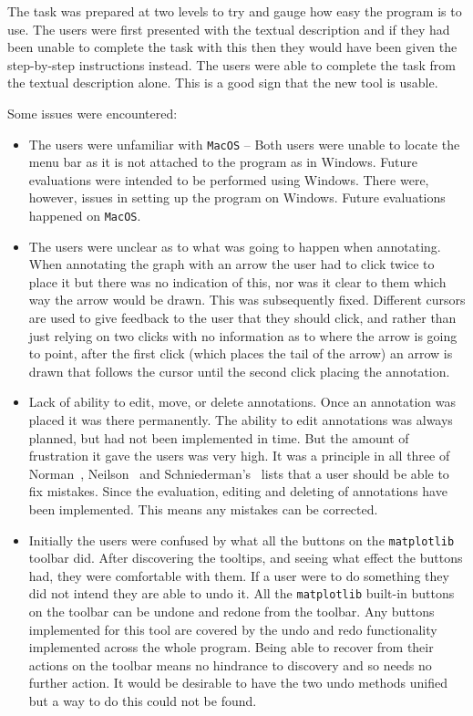 The task was prepared at two levels to try and gauge how easy the program is to use.  The users were first presented with the textual description and if they had been unable to complete the task with this then they would have been given the step-by-step instructions instead.  The users were able to complete the task from the textual description alone.  This is a good sign that the new tool is usable.

Some issues were encountered:

\begin{itemize}
\item The users were unfamiliar with \texttt{MacOS} -- Both users were unable to locate the menu bar as it is not attached to the program as in Windows.  Future evaluations were intended to be performed using Windows.  There were, however, issues in setting up the program on Windows.  Future evaluations happened on \texttt{MacOS}.
\item The users were unclear as to what was going to happen when annotating.  When annotating the graph with an arrow the user had to click twice to place it but there was no indication of this, nor was it clear to them which way the arrow would be drawn.  This was subsequently fixed. Different cursors are used to give feedback to the user that they should click, and rather than just relying on two clicks with no information as to where the arrow is going to point, after the first click (which places the tail of the arrow) an arrow is drawn that follows the cursor until the second click placing the annotation.
\item Lack of ability to edit, move, or delete annotations. Once an annotation was placed it was there permanently.  The ability to edit annotations was always planned, but had not been implemented in time.  But the amount of frustration it gave the users was very high.  It was a principle in all three of Norman~\cite{normsev}, Neilson~\cite{neilten} and Schniederman's~\cite{shgold} lists that a user should be able to fix mistakes.  Since the evaluation, editing and deleting of annotations have been implemented.  This means any mistakes can be corrected.
\item Initially the users were confused by what all the buttons on the \texttt{matplotlib} toolbar did.  After discovering the tooltips, and seeing what effect the buttons had, they were comfortable with them.  If a user were to do something they did not intend they are able to undo it. All the \texttt{matplotlib} built-in buttons on the toolbar can be undone and redone from the toolbar.  Any buttons implemented for this tool are covered by the undo and redo functionality implemented across the whole program.  Being able to recover from their actions on the toolbar means no hindrance to discovery and so needs no further action.  It would be desirable to have the two undo methods unified but a way to do this could not be found.

\end{itemize}
